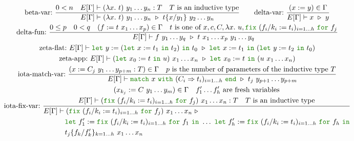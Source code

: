 \documentclass[a4paper,fleqn]{article}
\newcommand{\kwlet}{\mbox{\color{mygreen}\ttfamily let}}
\newcommand{\kwin}{\mbox{\color{mygreen}\ttfamily in}}
\newcommand{\kwmatch}{\mbox{\color{mygreen}\ttfamily match}}
\newcommand{\kwwith}{\mbox{\color{mygreen}\ttfamily with}}
\newcommand{\kwend}{\mbox{\color{mygreen}\ttfamily end}}
\newcommand{\kwfix}{\mbox{\color{mygreen}\ttfamily fix}}
\newcommand{\kwfor}{\mbox{\color{mygreen}\ttfamily for}}
\newcommand{\lam}[2]{\lambda #1.~#2}
\newcommand{\letin}[3]{\kwlet~#1:=#2~\kwin~#3}
\newcommand{\letinB}[2]{\kwlet~#1:=#2~\kwin}
\newcommand{\match}[4]{\kwmatch~#1~\kwwith~(#2 \Rightarrow #3)_{#4}~\kwend}
\newcommand{\fix}[4]{\kwfix~(#1 := #2)_{#3}~\kwfor~#4}
\newcommand{\subst}[3]{#1\{#2/#3\}}
\begin{document}
\begin{gather*}
  \text{beta-var:}~
    \dfrac{
      0 < n \quad
      E[\Gamma] \vdash (\lam{x}{t})~y_1\dots y_n : T \quad
      \text{$T$ is an inductive type}
    }{
      E[\Gamma] \vdash (\lam{x}{t})~y_1\dots y_n~\triangleright~\subst{t}{x}{y_1}~y_2\dots y_n
    } \qquad
  \text{delta-var:}~
    \dfrac{(x:=y) \in \Gamma}{E[\Gamma] \vdash x~\triangleright~y} \\
  \text{delta-fun:}~
     \dfrac
     {
       0 \leq p \quad
       0 < q \quad
       (f := t~x_1\ldots x_p) \in \Gamma \quad
       \text{$t$ is one of $x, c, C, \lam{x}{u}, \fix{f_i/k_i}{t_i}{i=1\dots h}{f_j}$}
     }{
       E[\Gamma] \vdash f~y_1\ldots y_q
                        ~\triangleright~
                        t~x_1\ldots x_p~y_1\dots y_q
     } \\
  \text{zeta-flat:}~
    E[\Gamma] \vdash \letin{y}{(\letin{x}{t_1}{t_2})}{t_0}
                       ~\triangleright~
                       \letin{x}{t_1}{(\letin{y}{t_2}{t_0})} \\
  \text{zeta-app:}~
    E[\Gamma] \vdash
     (\letin{x_0}{t}{u})~x_1\ldots x_n
     ~\triangleright~
     \letin{x_0}{t}{(u~x_1\ldots x_n)} \\
  \text{iota-match-var:}~
    \dfrac
    {
      (x:=C_j~y_1\ldots y_{p+m}:T) \in \Gamma \quad
      \text{$p$ is the number of parameters of the inductive type $T$}
    }{
      E[\Gamma] \vdash
      \match{x}{C_i}{t_i}{i=1\dots h}
      ~\triangleright~
      t_j~y_{p+1}\ldots y_{p+m}
    } \\
  \text{iota-fix-var:}~
    \dfrac
    {
      \begin{gathered}
        (x_{k_j} := C~y_1\ldots y_m) \in \Gamma \quad
        \text{$f'_1\dots f'_h$ are fresh variables} \\
        E[\Gamma] \vdash (\fix{f_i/k_i}{t_i}{i=1\dots h}{f_j})~x_1\ldots x_n : T \quad
        \text{$T$ is an inductive type}
      \end{gathered}
    }{
      \begin{aligned}
        E[\Gamma] &\vdash (\fix{f_i/k_i}{t_i}{i=1\dots h}{f_j})~x_1\ldots x_n ~\triangleright~ \\
                  &\quad \letinB{f'_1}{\fix{f_i/k_i}{t_i}{i=1\dots h}{f_1}}
                         ~\dots~
                         \letinB{f'_h}{\fix{f_i/k_i}{t_i}{i=1\dots h}{f_h}} \\
                  &\quad \subst{t_j}{f_k}{f'_k}_{k=1\dots h} ~x_1 \dots x_n
      \end{aligned}
}
\end{gather*}
\end{document}
